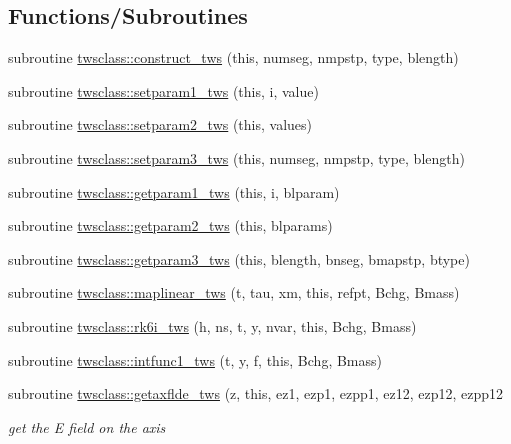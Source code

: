 \subsection*{Functions/\+Subroutines}
\begin{DoxyCompactItemize}
\item 
subroutine \mbox{\hyperlink{namespacetwsclass_a6528e082bfe1d870e027de8353b312c7}{twsclass\+::construct\+\_\+tws}} (this, numseg, nmpstp, type, blength)
\item 
subroutine \mbox{\hyperlink{namespacetwsclass_a15770a288893203a1f18bde3f1ab190c}{twsclass\+::setparam1\+\_\+tws}} (this, i, value)
\item 
subroutine \mbox{\hyperlink{namespacetwsclass_a24b51ee452bd448a84120562cb38c085}{twsclass\+::setparam2\+\_\+tws}} (this, values)
\item 
subroutine \mbox{\hyperlink{namespacetwsclass_acdc918f464e4b8dbf86ea0e00b0d7335}{twsclass\+::setparam3\+\_\+tws}} (this, numseg, nmpstp, type, blength)
\item 
subroutine \mbox{\hyperlink{namespacetwsclass_ac410f8e4606b3fdf3303f0976a2115dc}{twsclass\+::getparam1\+\_\+tws}} (this, i, blparam)
\item 
subroutine \mbox{\hyperlink{namespacetwsclass_a82176cb7e562eb7a78fffed55cbac554}{twsclass\+::getparam2\+\_\+tws}} (this, blparams)
\item 
subroutine \mbox{\hyperlink{namespacetwsclass_a07f751992638ce181255eef670d54c50}{twsclass\+::getparam3\+\_\+tws}} (this, blength, bnseg, bmapstp, btype)
\item 
subroutine \mbox{\hyperlink{namespacetwsclass_ab57cbdca9514adc28eb62c6bbb8633b6}{twsclass\+::maplinear\+\_\+tws}} (t, tau, xm, this, refpt, Bchg, Bmass)
\item 
subroutine \mbox{\hyperlink{namespacetwsclass_a2d527684d5c9fd42e3217ac03914bd90}{twsclass\+::rk6i\+\_\+tws}} (h, ns, t, y, nvar, this, Bchg, Bmass)
\item 
subroutine \mbox{\hyperlink{namespacetwsclass_a1681f57f6e70160ddb0f6e59f4cd5349}{twsclass\+::intfunc1\+\_\+tws}} (t, y, f, this, Bchg, Bmass)
\item 
subroutine \mbox{\hyperlink{namespacetwsclass_a9c88e1753c1d3faff3af95cf8c071d4f}{twsclass\+::getaxflde\+\_\+tws}} (z, this, ez1, ezp1, ezpp1, ez12, ezp12, ezpp12
\begin{DoxyCompactList}\small\item\em get the E field on the axis \end{DoxyCompactList}\item 

\end{DoxyCompactItemize}

